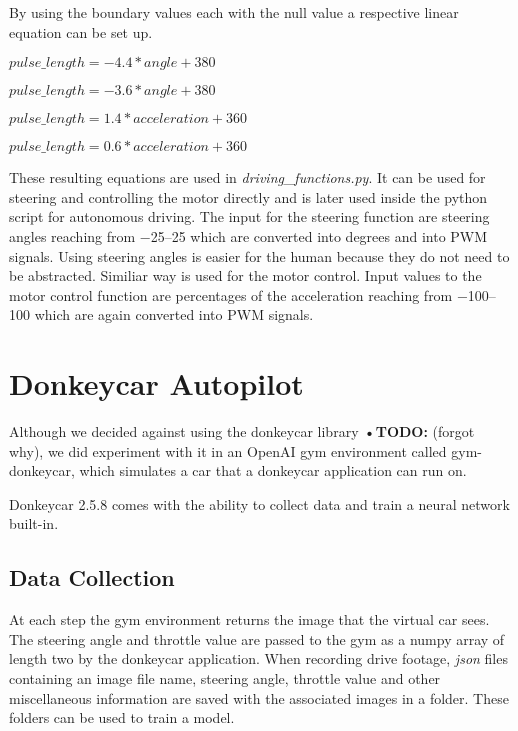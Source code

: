\documentclass[conference]{IEEEtran}
\begin{document}
By using the boundary values each with the null value a respective linear equation can be set up.
\begin{description}
\setlength\itemsep{.25em}
\item[Left] $ pulse\_length = -4.4 * angle + 380 $
\item[Right] $ pulse\_length = -3.6 * angle + 380 $
\item[Forwards] $ pulse\_length = 1.4 * acceleration + 360 $
\item[Backwards] $ pulse\_length = 0.6 * acceleration + 360 $
\end{description}
These resulting equations are used in \textit{driving\_functions.py}.
It can be used for steering and controlling the motor directly and is later used inside the python script for autonomous driving.
The input for the steering function are steering angles reaching from \numrange{-25}{25} which are converted into degrees and into PWM signals.
Using steering angles is easier for the human because they do not need to be abstracted.
Similiar way is used for the motor control.
Input values to the motor control function are percentages of the acceleration reaching from \numrange{-100}{100} which are again converted into PWM signals.

\section{Donkeycar Autopilot}

Although we decided against using the donkeycar library \textbf{•TODO:} (forgot why), we did experiment with it in an OpenAI gym environment called gym-donkeycar, which simulates a car that a donkeycar application can run on.

Donkeycar 2.5.8 comes with the ability to collect data and train a neural network built-in.

\subsection{Data Collection}

At each step the gym environment returns the image that the virtual car sees. 
The steering angle and throttle value are passed to the gym as a numpy array of length two by the donkeycar application. 
When recording drive footage, \textit{json} files containing an image file name, steering angle, throttle value and other miscellaneous information are saved with the associated images in a folder. 
These folders can be used to train a model.
\end{document}
